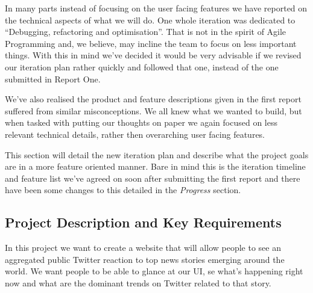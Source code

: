 \documentclass[a4paper,12pt]{article}
\begin{document}
In many parts instead of focusing on the user facing features we have reported on the technical aspects of what we will do. One whole iteration was dedicated to ``Debugging, refactoring and optimisation''. That is not in the spirit of Agile Programming and, we believe, may incline the team to focus on less important things. With this in mind we've decided it would be very advisable if we revised our iteration plan rather quickly and followed that one, instead of the one submitted in Report One.

  We've also realised the product and feature descriptions given in the first report suffered from similar misconceptions. We all knew what we wanted to build, but when tasked with putting our thoughts on paper we again focused on less relevant technical details, rather then overarching user facing features.

  This section will detail the new iteration plan and describe what the project goals are in a more feature oriented manner. Bare in mind this is the iteration timeline and feature list we've agreed on soon after submitting the first report and there have been some changes to this detailed in the \emph{Progress} section. 

  \subsection{Project Description and Key Requirements}
  In this project we want to create a website that will allow people to see an aggregated public Twitter reaction to top news stories emerging around the world. We want people to be able to glance at our UI, se what's happening right now and what are the dominant trends on Twitter related to that story.
\end{document}
